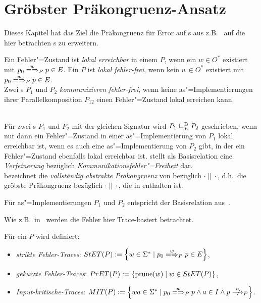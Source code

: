 \section{Gröbster Präkongruenz-Ansatz}

Dieses Kapitel hat das Ziel die Präkongruenz für Error auf \EIO{}s aus
z.B.~\cite{Schinko2016BA} auf die hier betrachten \MEIO{}s zu erweitern.

\begin{Def}
  Ein Fehler"=Zustand ist \emph{lokal erreichbar} in einem \MEIO{} $P$, wenn
  ein $w\in O^*$ existiert mit $p_0 \weakmay[w]_P p\in E$. Ein \MEIO{} $P$
  ist \emph{lokal fehler-frei}, wenn kein $w\in O^*$ existiert mit $p_0
  \weakmay[w]_P p\in E$.\\
  Zwei \MEIO{}s $P_1$ und $P_2$ \emph{kommunizieren fehler-frei}, wenn keine
  as"=Implementierungen ihrer Parallelkomposition $P_{12}$ einen
  Fehler"=Zustand lokal erreichen kann.
\end{Def}

\vspace{0.2cm}

\begin{Def}
  \label{EBRelDef}\mbox{}\\
  Für zwei \MEIO{}s $P_1$ und $P_2$ mit der gleichen Signatur wird $P_1 \sqsubseteq  _E^\mathrm{B}{}
  P_2$ geschrieben, wenn nur dann ein Fehler"=Zustand in einer
  as"=Implementierung von $P_1$ lokal erreichbar ist, wenn es auch eine
  as"=Implementierung von $P_2$ gibt, in der ein Fehler"=Zustand ebenfalls
  lokal erreichbar ist. \EBRel{} stellt als Basisrelation eine
  \emph{Verfeinerung} bezüglich \emph{Kommunikationsfehler"=Freiheit} dar.\\
  \ECRel{} bezeichnet die \emph{vollständig abstrakte Präkongruenz} von
  \EBRel{} bezüglich $\cdot\|\cdot$, d.h.\ die gröbste Präkongruenz bezüglich
  $\cdot\|\cdot$, die in \EBRel{} enthalten ist.
  \\ 
\end{Def}

Für as"=Implementierungen $P_1$ und $P_2$ entspricht \EBRel{} der Basisrelation
\EBbaRel{} aus~\cite{Schinko2016BA}.

Wie z.B.\ in~\cite{Schinko2016BA} werden die Fehler hier Trace-basiert
betrachtet.

\begin{Def}
  \label{KommTracesDef}
  Für ein \MEIO{} $P$ wird definiert:
  \begin{itemize}
    \item \emph{strikte Fehler-Traces}: $\StET (P) :=
      \left\{w\in\Sigma ^* \mid p_0 \weakmay[w]_P p \in E\right\}$,
    \item \emph{gekürzte Fehler-Traces}: $PrET (P) :=
      \left\{\mathrm{prune} (w) \mid w\in StET (P)\right\}$,
    \item \emph{Input-kritische-Traces}: $\MIT (P) := \left\{wa\in\Sigma ^*
      \mid p_0 \weakmay[w]_P p \land a\in I\land p\nmust[a]_P \right\}$.
  \end{itemize}
\end{Def}

